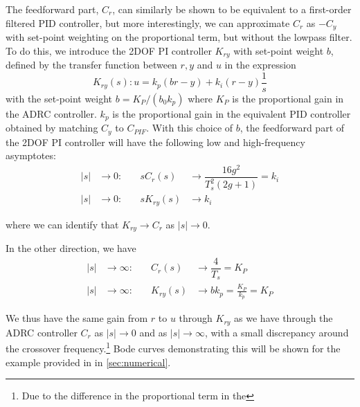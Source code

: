\documentclass[letterpaper, 10 pt, conference]{ieeeconf}
\begin{document}
The feedforward part, $C_r$, can similarly be shown to be equivalent to a first-order filtered PID controller, but more interestingly, we can approximate $C_r$ as $-C_y$ with set-point weighting on the proportional term, but without the lowpass filter. To do this, we introduce the 2DOF PI controller $K_{ry}$ with set-point weight $b$, defined by the transfer function between $r,y$ and $u$ in the expression
$$K_{ry}(s) : u = k_p (br - y) + k_i(r-y)\frac{1}{s}$$
with the set-point weight $b = K_P / (b_0 k_p)$ where $K_P$ is the proportional gain in the ADRC controller. $k_p$ is the proportional gain in the equivalent PID controller obtained by matching $C_y$ to $C_{PIF}$. With this choice of $b$, the feedforward part of the 2DOF PI controller will have the following low and high-frequency asymptotes:
\begin{align}
	|s| &\to 0:  & \quad sC_r(s) &\to \dfrac{16g^2}{T_{s}^2(2g + 1)} = k_i  \\
	|s| &\to 0:  & \quad sK_{ry}(s) &\to k_i
\end{align}

where we can identify that $K_{ry} \to C_r$ as $|s| \to 0$.

In the other direction, we have
\begin{align}
	|s| &\to \infty:  & \quad C_r(s) &\to \dfrac{4}{T_s} = K_P\\
	|s| &\to \infty:  & \quad K_{ry}(s) &\to b k_p = \frac{K_P}{k_p} = K_P
\end{align}

We thus have the same gain from $r$ to $u$ through $K_{ry}$ as we have through the ADRC controller $C_r$ as $|s| \to 0$ and as $|s| \to \infty$, with a small discrepancy around the crossover frequency.\footnote{Due to the difference in the proportional term in the } Bode curves demonstrating this will be shown for the example provided in \cite{herbst2013simulative} in \cref{sec:numerical}.
\end{document}
